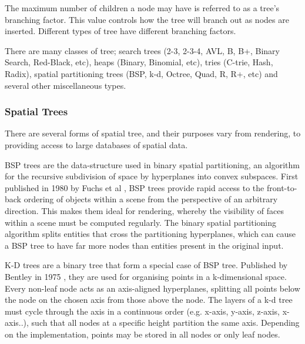     The maximum number of children a node may have is referred to as a tree's branching factor. This value controls how the tree will branch out as nodes are inserted. Different types of tree have different branching factors.

    There are many classes of tree; search trees (2-3, 2-3-4, AVL, B, B+, Binary Search, Red-Black, etc), heaps (Binary, Binomial, etc), tries (C-trie, Hash, Radix), spatial partitioning trees (BSP, k-d, Octree, Quad, R, R+, etc) and several other miscellaneous types. \begin{comment}B trees and their descendants are optimised for sequential data accesses, often used in databases.\end{comment}
    
    \subsubsection*{Spatial Trees}
      There are several forms of spatial tree, and their purposes vary from rendering, to providing access to large databases of spatial data.
      
      BSP trees are the data-structure used in binary spatial partitioning, an algorithm for the recursive subdivision of space by \glspl{hyperplane} into convex subspaces. First published in 1980 by Fuchs et al \cite{FKN80}, BSP trees provide rapid access to the front-to-back ordering of objects within a scene from the perspective of an arbitrary direction. This makes them ideal for rendering, whereby the visibility of faces within a scene must be computed regularly. The binary spatial partitioning algorithm splits entities that cross the partitioning \glspl{hyperplane}, which can cause a BSP tree to have far more nodes than entities present in the original input.
    
      K-D trees are a binary tree that form a special case of BSP tree. Published by Bentley in 1975 \cite{Ben75}, they are used for organising points in a k-dimensional space. Every non-leaf node acts as an axis-aligned \glspl{hyperplane}, splitting all points below the node on the chosen axis from those above the node. The layers of a k-d tree must cycle through the axis in a continuous order (e.g. x-axis, y-axis, z-axis, x-axis..), such that all nodes at a specific height partition the same axis. Depending on the implementation, points may be stored in all nodes or only leaf nodes.
      
